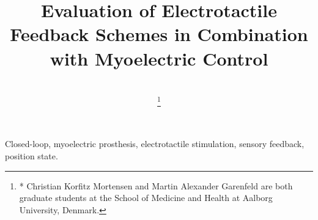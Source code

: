 \documentclass[journal]{IEEEtran}
\begin{document}
\title{Evaluation of Electrotactile Feedback Schemes in Combination with Myoelectric Control\\
}

\author{\\
	\thanks{* Christian Korfitz Mortensen and Martin Alexander Garenfeld are both graduate students at the School of Medicine and Health at Aalborg University, Denmark.}
} 


%
%
%
%

\maketitle

\begin{abstract}

\end{abstract}

\begin{IEEEkeywords}
Closed-loop, myoelectric prosthesis, electrotactile stimulation, sensory feedback, position state. 
\end{IEEEkeywords}
\end{document}
